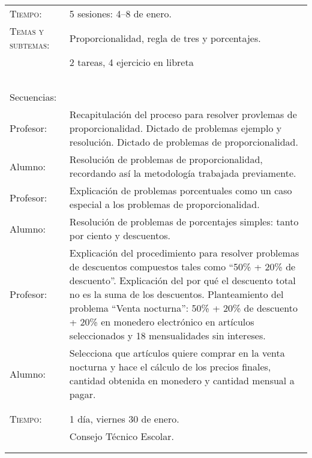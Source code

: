 \documentclass[letterpaper,10pt]{article}
\begin{document}
\begin{tabular}[t]{R{0.25\textwidth}p{0.71\textwidth}}
    \textsc{Tiempo:}                    & 5 sesiones: 4--8  de enero. \\
    \textsc{Temas y subtemas:}          & Proporcionalidad, regla de tres y porcentajes.\\
              & 2 tareas, 4 ejercicio en libreta\\ \\
    \large{\sc Secuencias:} \\
    Profesor:   & Recapitulaci\'on del proceso para resolver provlemas de proporcionalidad. Dictado de problemas ejemplo y resoluci\'on. Dictado de problemas de proporcionalidad.\\
    Alumno:     & Resoluci\'on de problemas de proporcionalidad, recordando as\'i la metodolog\'ia trabajada previamente.  \\
    Profesor:   & Explicaci\'on de problemas porcentuales como un caso especial a los problemas de proporcionalidad. \\
    Alumno:     & Resoluci\'on de problemas de porcentajes simples: tanto por ciento y descuentos. \\
    Profesor:   & Explicaci\'on del procedimiento para resolver problemas de descuentos compuestos tales como ``50\% + 20\% de descuento''. Explicaci\'on del por qu\'e el descuento total no es la suma de los descuentos. Planteamiento del problema ``Venta nocturna'': 50\% + 20\% de descuento + 20\% en monedero electr\'onico en art\'iculos seleccionados y 18 mensualidades sin intereses. \\
    Alumno:     & Selecciona que art\'iculos quiere comprar en la venta nocturna y hace el c\'alculo de los precios finales, cantidad obtenida en monedero y cantidad mensual a pagar. \\
\\ \hline \\
    \textsc{Tiempo:}& 1 d\'ia, viernes 30 de enero. \\
                    & {\Large \sc Consejo T\'ecnico Escolar.} \\ 
\\ \hline \\

\end{tabular}
\end{document}
